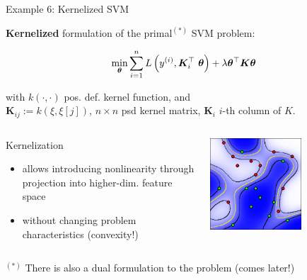 \documentclass[11pt,compress,t,notes=noshow, xcolor=table]{beamer}
\begin{document}
\begin{vbframe}{Example 6: Kernelized SVM} 

\textbf{Kernelized} formulation of the primal$^{(*)}$ SVM problem: 

\begin{eqnarray*}
	\min_{\bm{\theta}}\sum\limits_{i=1}^n L\left(y^{(i)}, \bm{K}_i^\top ~\bm{\theta}\right) + \lambda \bm{\theta}^\top \bm{K} \bm{\theta} 
\end{eqnarray*}

with $k(\cdot, \cdot)$ pos. def. kernel function, and \\$\bm{K}_{ij} := k(\xi, \xi[j])$, $n \times n$ psd kernel matrix, $\bm{K}_i$ $i$-th column of $K$. 

\vspace*{0.2cm}

\begin{columns}[T] %
	\begin{column}{.6\textwidth} 
        Kernelization 
        
        \begin{itemize}
        	\item allows introducing nonlinearity through projection into higher-dim. feature space
        	\item without changing problem characteristics (convexity!)
        \end{itemize}
	\end{column}
	\begin{column}{.4\textwidth}
		\begin{center}
				\vspace*{-0.5cm}
		    \includegraphics[width=0.6\textwidth]{figure_man/nonlinear-svm-c.pdf}
		\end{center}
	\end{column}

\end{columns}

\vfill
\begin{footnotesize}
$^{(*)}$ There is also a dual formulation to the problem (comes later!)
\end{footnotesize}



\end{vbframe}
\end{document}
